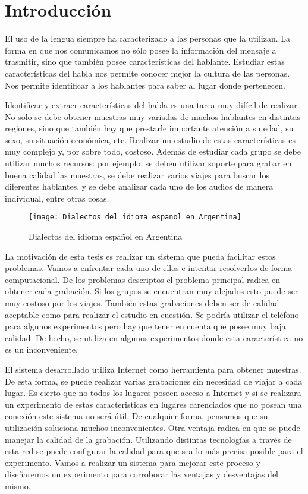 
\chapter{Introducción}


El uso de la lengua siempre ha caracterizado a las personas que la utilizan. La forma en que nos comunicamos no sólo posee la información del mensaje a trasmitir, sino que también posee características del hablante. Estudiar estas características del habla nos permite conocer mejor la cultura de las personas. Nos permite identificar a los hablantes para saber al lugar donde pertenecen.

Identificar y extraer características del habla es una tarea muy difícil de realizar. No solo se debe obtener muestras muy variadas de muchos hablantes en distintas regiones, sino que también hay que prestarle importante atención a su edad, su sexo, su situación económica, etc. Realizar un estudio de estas características es muy complejo y, por sobre todo, costoso. Además de estudiar cada grupo se debe utilizar muchos recursos: por ejemplo, se deben utilizar soporte para grabar en buena calidad las muestras, se debe realizar varios viajes para buscar los diferentes hablantes, y se debe analizar cada uno de los audios de manera individual, entre otras cosas. 

\begin{figure}[h!]
    \texttt{[image: Dialectos\_del\_idioma\_espanol\_en\_Argentina]} 
    \caption{Dialectos del idioma español en Argentina}
    \label{fig11}
\end{figure}

La motivación de esta tesis es realizar un sistema que pueda facilitar estos problemas. Vamos a enfrentar cada uno de ellos e intentar resolverlos de forma computacional. De los problemas descriptos el problema principal radica en obtener cada grabación. Si los grupos se encuentran muy alejados esto puede ser muy costoso por los viajes. También estas grabaciones deben ser de calidad aceptable como para realizar el estudio en cuestión. Se podría utilizar el teléfono para algunos experimentos pero hay que tener en cuenta que posee muy baja calidad. De hecho, se utiliza en algunos experimentos donde esta característica no es un inconveniente. 

El sistema desarrollado utiliza Internet como herramienta para obtener muestras. De esta forma, se puede realizar varias grabaciones sin necesidad de viajar a cada lugar. Es cierto que no todos los lugares poseen acceso a Internet y si se realizara un experimento de estas caracteristicas en lugares carenciados que no posean una conexión este sistema no será útil. De cualquier forma, pensamos que su utilización soluciona muchos inconvenientes. Otra ventaja radica en que se puede manejar la calidad de la grabación. Utilizando distintas tecnologías a través de esta red se puede configurar la calidad para que sea lo más precisa posible para el experimento. Vamos a realizar un sistema para mejorar este proceso y diseñaremos un experimento para corroborar las ventajas y desventajas del mismo.

